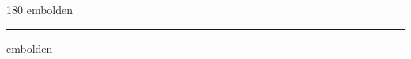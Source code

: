 
\begin{frame}
\begin{center}
\begin{turn}{180}
{\fontsize{2.5cm}{1em}\selectfont embolden}
\end{turn}
\vspace{1em}\par  
\hrule
\vspace{1em}\par  
{\fontsize{2.5cm}{1em}\selectfont embolden}
\end{center}
\end{frame}

